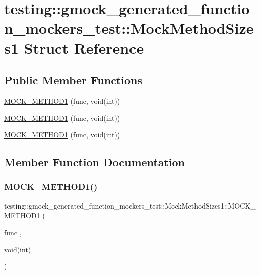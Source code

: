 \hypertarget{structtesting_1_1gmock__generated__function__mockers__test_1_1_mock_method_sizes1}{}\section{testing\+::gmock\+\_\+generated\+\_\+function\+\_\+mockers\+\_\+test\+::Mock\+Method\+Sizes1 Struct Reference}
\label{structtesting_1_1gmock__generated__function__mockers__test_1_1_mock_method_sizes1}
\subsection*{Public Member Functions}
\begin{DoxyCompactItemize}
\item 
\mbox{\hyperlink{structtesting_1_1gmock__generated__function__mockers__test_1_1_mock_method_sizes1_af4d80458626303520a848ad15e0e8121}{M\+O\+C\+K\+\_\+\+M\+E\+T\+H\+O\+D1}} (func, void(int))
\item 
\mbox{\hyperlink{structtesting_1_1gmock__generated__function__mockers__test_1_1_mock_method_sizes1_af4d80458626303520a848ad15e0e8121}{M\+O\+C\+K\+\_\+\+M\+E\+T\+H\+O\+D1}} (func, void(int))
\item 
\mbox{\hyperlink{structtesting_1_1gmock__generated__function__mockers__test_1_1_mock_method_sizes1_af4d80458626303520a848ad15e0e8121}{M\+O\+C\+K\+\_\+\+M\+E\+T\+H\+O\+D1}} (func, void(int))
\end{DoxyCompactItemize}


\subsection{Member Function Documentation}
\mbox{\label{structtesting_1_1gmock__generated__function__mockers__test_1_1_mock_method_sizes1_af4d80458626303520a848ad15e0e8121}} 
\subsubsection{\texorpdfstring{MOCK\_METHOD1()}{MOCK\_METHOD1()}\hspace{0.1cm}{\footnotesize\ttfamily [1/3]}}
{\footnotesize\ttfamily testing\+::gmock\+\_\+generated\+\_\+function\+\_\+mockers\+\_\+test\+::\+Mock\+Method\+Sizes1\+::\+M\+O\+C\+K\+\_\+\+M\+E\+T\+H\+O\+D1 (\begin{DoxyParamCaption}\item[{func}]{,  }\item[{void(int)}]{ }\end{DoxyParamCaption})}

